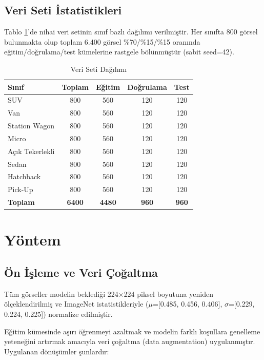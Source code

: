 \documentclass[conference]{IEEEtran}
\begin{document}
\subsection{Veri Seti İstatistikleri}

Tablo \ref{tab:dataset}'de nihai veri setinin sınıf bazlı dağılımı
verilmiştir. Her sınıfta 800 görsel bulunmakta olup toplam 6.400 görsel
\%70/\%15/\%15 oranında eğitim/doğrulama/test kümelerine rastgele
bölünmüştür (sabit seed=42).

\begin{table}[h]
\caption{Veri Seti Dağılımı}
\label{tab:dataset}
\centering
\begin{tabular}{lcccc}
\toprule
\textbf{Sınıf} & \textbf{Toplam} & \textbf{Eğitim} & \textbf{Doğrulama} & \textbf{Test} \\
\midrule
SUV             & 800 & 560 & 120 & 120 \\
Van             & 800 & 560 & 120 & 120 \\
Station Wagon   & 800 & 560 & 120 & 120 \\
Micro           & 800 & 560 & 120 & 120 \\
Açık Tekerlekli & 800 & 560 & 120 & 120 \\
Sedan           & 800 & 560 & 120 & 120 \\
Hatchback       & 800 & 560 & 120 & 120 \\
Pick-Up         & 800 & 560 & 120 & 120 \\
\midrule
\textbf{Toplam} & \textbf{6400} & \textbf{4480} & \textbf{960} & \textbf{960} \\
\bottomrule
\end{tabular}
\end{table}

\section{Yöntem}

\subsection{Ön İşleme ve Veri Çoğaltma}

Tüm görseller modelin beklediği 224$\times$224 piksel boyutuna yeniden
ölçeklendirilmiş ve ImageNet istatistikleriyle
($\mu$=[0.485, 0.456, 0.406], $\sigma$=[0.229, 0.224, 0.225])
normalize edilmiştir.

Eğitim kümesinde aşırı öğrenmeyi azaltmak ve modelin farklı koşullara
genelleme yeteneğini artırmak amacıyla veri çoğaltma (data augmentation)
uygulanmıştır. Uygulanan dönüşümler şunlardır:
\end{document}
